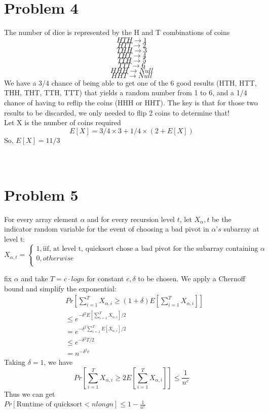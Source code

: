 \documentclass{article}
\begin{document}
 \section*{Problem 4}
 The number of dice is represented by the H and T combinations of coins\\
 $$ HTH \rightarrow 1$$
 $$ HTT \rightarrow 2$$
 $$ THH \rightarrow 3$$
 $$ THT \rightarrow 4$$
 $$ TTH \rightarrow 5$$
 $$ TTT \rightarrow 6$$
 $$ HHH \rightarrow Null$$
 $$ HHT \rightarrow Null$$
We have a 3/4 chance of being able to get one of the 6 good results (HTH, HTT, THH, THT, TTH, TTT) that yields a random number from 1 to 6, and a 1/4 chance of having to reflip the coins (HHH or HHT). The key is that for those two results to be discarded, we only needed to flip 2 coins to determine that!\\
Let  X is the number of coins required\\
$$E[X] = 3/4 \times 3 +1/4 \times(2+E[X])$$
So, $E[X] = 11/3$\\
\\
\\

 \section*{Problem 5}
 For every array element $α$ and for every recursion level $t$, let $X_α,t$ be the indicator random variable for the event of choosing a bad pivot in $α’s$ subarray at level t:\\
 \begin{equation}
 X_{\alpha,t} = \left\{ 
 \begin{array}{ll}
 1, \text{iif, at level t, quicksort chose a bad pivot for the subarray containing } \alpha\\
 0 ,otherwise&\\
 \end{array}\right.
 \end{equation}
 
 fix $\alpha$ and take $T =c·logn$ for  constant $c,\delta$  to be chosen. We apply a Chernoff bound and simplify the exponential:\\
 	\begin{equation}
 	\begin{aligned}	
 	&Pr[\sum\limits_{i=1}^{T}X_{\alpha,i}\ge (1+\delta)E[  \sum\limits_{i=1}^{T}X_{\alpha,i}]]\\
 	&\le e^{-\delta^2 E[  \sum\limits_{i=1}^{T}X_{\alpha,i}]/2}\\
    &= e^{-\delta^2 \sum\limits_{i=1}^{T}E[  X_{\alpha,i}]/2}\\
 	& \le e^{-\delta^2T/2}\\
 	&= n^{-\delta^2c}\nonumber
 	\end{aligned}
 	\end{equation}
 Taking $\delta = 1$, we have\\
 $$Pr[\sum\limits_{i=1}^{T}X_{\alpha,i}\ge 2E[  \sum\limits_{i=1}^{T}X_{\alpha,i}]]\le \frac{1}{n^c}$$
 Thus we can get \\
 $Pr[\text{Runtime of quicksort}< nlongn]\le 1- \frac{1}{n^c}$
\end{document}
